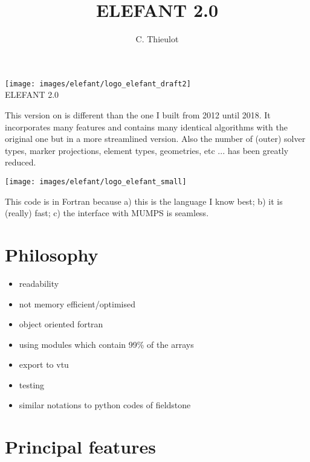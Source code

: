 \documentclass[a4paper,12pt]{article}
\title{ELEFANT 2.0}
\author{C. Thieulot}
\begin{document}
\thispagestyle{empty}

\begin{center}
\texttt{[image: images/elefant/logo\_elefant\_draft2]}\\
{\large ELEFANT 2.0}
\end{center}

\newpage

\tableofcontents

\newpage

This version on \elefant is different than the one I built from 2012 until 2018.
It incorporates many features and contains many identical algorithms with the original 
one but in a more streamlined version. Also the number of (outer) solver types, marker projections, 
element types, geometries, etc ... has been greatly reduced. 

\begin{center}
\texttt{[image: images/elefant/logo\_elefant\_small]}
\end{center}

This code is in Fortran because a) this is the language I know best; b) it is (really) fast;
c) the interface with MUMPS is seamless.  




\section{Philosophy}
\begin{itemize}
\item readability
\item not memory efficient/optimised
\item object oriented fortran
\item using modules which contain 99\% of the arrays
\item export to vtu 
\item testing
\item similar notations to python codes of fieldstone
\end{itemize}

\section{Principal features}
\end{document}
